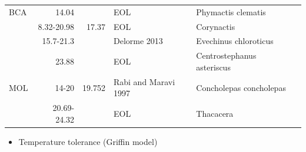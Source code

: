 \documentclass[11pt]{article}
\begin{document}
\begin{itemize}
\begin{center}
\begin{tabular}{lrrlll}
\hline
 BCA  &        14.04  &              &  EOL                         &  Phymactis clematis          &                                            \\
      &   8.32-20.98  &       17.37  &  EOL                         &  Corynactis                  &                                            \\
      &    15.7-21.3  &              &  Delorme 2013                &  Evechinus chloroticus       &                                            \\
      &        23.88  &              &  EOL                         &  Centrostephanus asteriscus  &                                            \\
\hline
 MOL  &        14-20  &      19.752  &  Rabi and Maravi 1997        &  Concholepas concholepas     &                                            \\
      &  20.69-24.32  &              &  EOL                         &  Thacacera                   &                                            \\
\end{tabular}
\end{center}



\begin{itemize}

\item Temperature tolerance (Griffin model)
\label{sec-5-2-1-13-2-1}%
\end{itemize} %
\end{itemize} %
\end{document}
